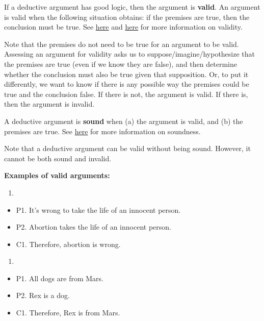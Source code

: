\documentclass[]{article}
\providecommand{\tightlist}{%
  \setlength{\itemsep}{0pt}\setlength{\parskip}{0pt}}
\begin{document}
If a deductive argument has good logic, then the argument is
\textbf{valid}. An argument is valid when the following situation
obtains: if the premises are true, then the conclusion must be true. See
\href{http://www.wi-phi.com/video/validity}{here} and
\href{http://www.wi-phi.com/video/truth-and-validity}{here} for more
information on validity.

Note that the premises do not need to be true for an argument to be
valid. Assessing an argument for validity asks us to
suppose/imagine/hypothesize that the premises are true (even if we know
they are false), and then determine whether the conclusion must also be
true given that supposition. Or, to put it differently, we want to know
if there is any possible way the premises could be true and the
conclusion false. If there is not, the argument is valid. If there is,
then the argument is invalid.

A deductive argument is \textbf{sound} when (a) the argument is valid,
and (b) the premises are true. See
\href{http://www.wi-phi.com/video/soundness}{here} for more information
on soundness.

Note that a deductive argument can be valid without being sound.
However, it cannot be both sound and invalid.

\textbf{Examples of valid arguments:}

\begin{enumerate}
\def\labelenumi{\arabic{enumi})}
\item
\end{enumerate}

\begin{itemize}
\tightlist
\item
  P1. It's wrong to take the life of an innocent person.
\item
  P2. Abortion takes the life of an innocent person.
\item
  C1. Therefore, abortion is wrong.
\end{itemize}

\begin{enumerate}
\def\labelenumi{\arabic{enumi})}
\setcounter{enumi}{1}
\item
\end{enumerate}

\begin{itemize}
\tightlist
\item
  P1. All dogs are from Mars.
\item
  P2. Rex is a dog.
\item
  C1. Therefore, Rex is from Mars.
\end{itemize}
\end{document}
